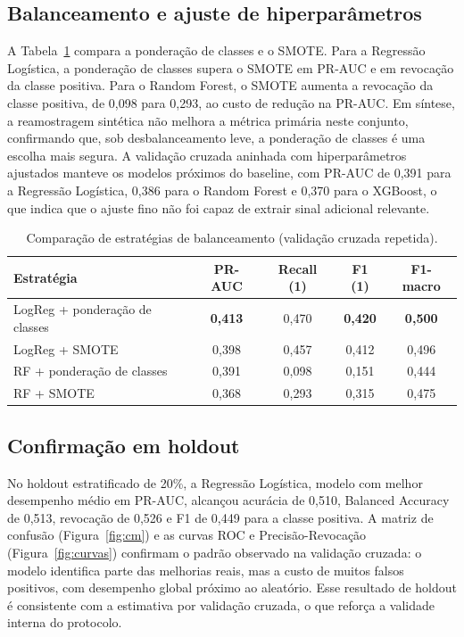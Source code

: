 \documentclass[12pt]{article}
\begin{document}
\subsection{Balanceamento e ajuste de hiperparâmetros}

A Tabela~\ref{tab:balanceamento} compara a ponderação de classes e o SMOTE. Para a Regressão
Logística, a ponderação de classes supera o SMOTE em PR-AUC e em revocação da classe positiva. Para
o Random Forest, o SMOTE aumenta a revocação da classe positiva, de 0,098 para 0,293, ao custo de
redução na PR-AUC. Em síntese, a reamostragem sintética não melhora a métrica primária neste
conjunto, confirmando que, sob desbalanceamento leve, a ponderação de classes é uma escolha mais
segura. A validação cruzada aninhada com hiperparâmetros ajustados manteve os modelos próximos do
baseline, com PR-AUC de 0,391 para a Regressão Logística, 0,386 para o Random Forest e 0,370 para o
XGBoost, o que indica que o ajuste fino não foi capaz de extrair sinal adicional relevante.

\begin{table}[ht]
\centering
\caption{Comparação de estratégias de balanceamento (validação cruzada repetida).}
\label{tab:balanceamento}
\small
\begin{tabular}{lcccc}
\toprule
\textbf{Estratégia} & \textbf{PR-AUC} & \textbf{Recall (1)} & \textbf{F1 (1)} & \textbf{F1-macro} \\
\midrule
LogReg + ponderação de classes & \textbf{0,413} & 0,470 & \textbf{0,420} & \textbf{0,500} \\
LogReg + SMOTE & 0,398 & 0,457 & 0,412 & 0,496 \\
RF + ponderação de classes & 0,391 & 0,098 & 0,151 & 0,444 \\
RF + SMOTE & 0,368 & 0,293 & 0,315 & 0,475 \\
\bottomrule
\end{tabular}
\end{table}

\subsection{Confirmação em holdout}

No holdout estratificado de 20\%, a Regressão Logística, modelo com melhor desempenho médio em
PR-AUC, alcançou acurácia de 0,510, Balanced Accuracy de 0,513, revocação de 0,526 e F1 de 0,449
para a classe positiva. A matriz de confusão (Figura~\ref{fig:cm}) e as curvas ROC e
Precisão-Revocação (Figura~\ref{fig:curvas}) confirmam o padrão observado na validação cruzada: o
modelo identifica parte das melhorias reais, mas a custo de muitos falsos positivos, com desempenho
global próximo ao aleatório. Esse resultado de holdout é consistente com a estimativa por validação
cruzada, o que reforça a validade interna do protocolo.
\end{document}
